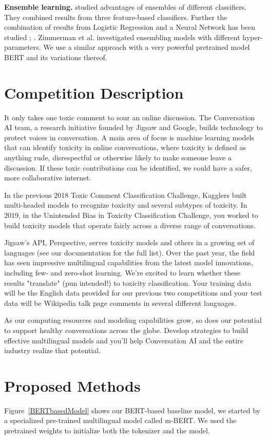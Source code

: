 \documentclass[10pt,twocolumn,letterpaper]{article}
\begin{document}
\textbf{Ensemble learning.} \cite{r06} studied advantages of ensembles of different classifiers. They combined results from three feature-based classifiers. Further the combination of results from Logistic Regression and a Neural Network has been studied \cite{r34}; \cite{r35}. Zimmerman et al. \cite{r36} investigated ensembling models with different hyper-parameters. We use a similar approach with a very powerful pretrained model BERT and its variations thereof.

\section{Competition Description}

It only takes one toxic comment to sour an online discussion. The Conversation AI team, a research initiative founded by Jigsaw and Google, builds technology to protect voices in conversation. A main area of focus is machine learning models that can identify toxicity in online conversations, where toxicity is defined as anything rude, disrespectful or otherwise likely to make someone leave a discussion. If these toxic contributions can be identified, we could have a safer, more collaborative internet.

In the previous 2018 Toxic Comment Classification Challenge, Kagglers built multi-headed models to recognize toxicity and several subtypes of toxicity. In 2019, in the Unintended Bias in Toxicity Classification Challenge, you worked to build toxicity models that operate fairly across a diverse range of conversations. 

Jigsaw's API, Perspective, serves toxicity models and others in a growing set of languages (see our documentation for the full list). Over the past year, the field has seen impressive multilingual capabilities from the latest model innovations, including few- and zero-shot learning. We're excited to learn whether these results "translate" (pun intended!) to toxicity classification. Your training data will be the English data provided for our previous two competitions and your test data will be Wikipedia talk page comments in several different languages.

As our computing resources and modeling capabilities grow, so does our potential to support healthy conversations across the globe. Develop strategies to build effective multilingual models and you'll help Conversation AI and the entire industry realize that potential.

\section{Proposed Methods}
Figure~\ref{BERTbasedModel} shows our BERT-based\cite{devlin2018bert} baseline model, we started by a specialized pre-trained multilingual model called m-BERT. We used the pretrained weights to initialize both the tokenizer and the model.
\end{document}
